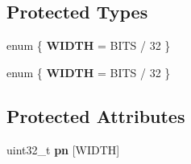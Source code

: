 \subsection*{Protected Types}
\begin{DoxyCompactItemize}
\item 
\mbox{\label{classbase__uint_afee51629f03ba95d823ab4ee94cf6c81}} 
enum \{ {\bfseries W\+I\+D\+TH} = B\+I\+TS / 32
 \}
\item 
\mbox{\label{classbase__uint_a99b16ebe6347ba43513af22cbe075709}} 
enum \{ {\bfseries W\+I\+D\+TH} = B\+I\+TS / 32
 \}
\end{DoxyCompactItemize}
\subsection*{Protected Attributes}
\begin{DoxyCompactItemize}
\item 
\mbox{\label{classbase__uint_ab244f5975a20631fe16389124983ba26}} 
uint32\+\_\+t {\bfseries pn} \mbox{[}W\+I\+D\+TH\mbox{]}
\end{DoxyCompactItemize}

